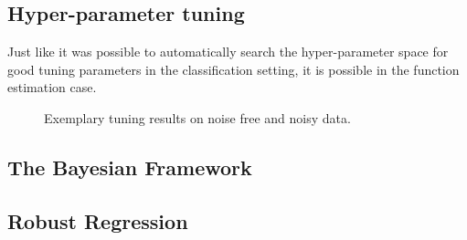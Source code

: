 \subsection{Hyper-parameter tuning}
Just like it was possible to automatically search the hyper-parameter space for good tuning parameters in the classification setting, it is possible in the function estimation case. 


\begin{figure}
\centering


\caption{Exemplary tuning results on noise free and noisy data.}
\label{fig:autoTune}
\end{figure}

\subsection{The Bayesian Framework}

\subsection{Robust Regression}
